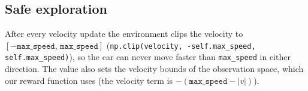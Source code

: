 \subsection{Safe exploration}

\begin{solution}
After every velocity update the environment clips the velocity to $[-\texttt{max\_speed},\,\texttt{max\_speed}]$
(\texttt{np.clip(velocity, -self.max\_speed, self.max\_speed)}), so the car can never move faster than
\texttt{max\_speed} in either direction. The value also sets the velocity bounds of the observation space, which our
reward function uses (the velocity term is $-(\texttt{max\_speed}-|v|)$).
\end{solution}

